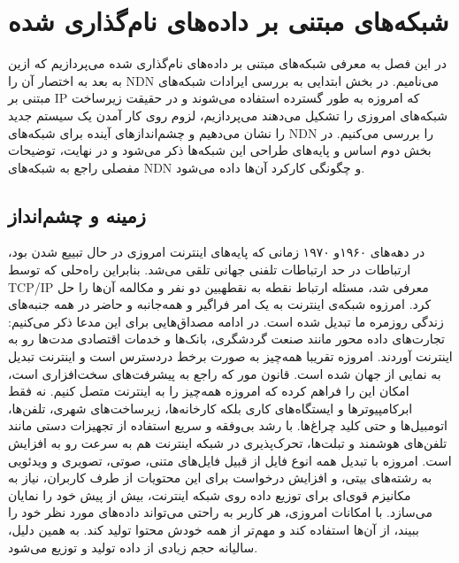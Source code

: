 

\chapter{ شبکه‌های مبتنی بر داده‌های نام‌گذاری شده}
در این فصل به معرفی شبکه‌های مبتنی بر داده‌های نام‌گذاری شده می‌پردازیم که ازین به بعد به اختصار آن را  NDN می‌نامیم.  در بخش ابتدایی به بررسی ایرادات شبکه‌های مبتنی بر IP که امروزه به طور گسترده استفاده می‌شوند و در حقیقت زیرساخت شبکه‌های امروزی را تشکیل می‌دهند می‌پردازیم، لزوم روی کار آمدن یک سیستم جدید را نشان می‌دهیم و چشم‌اندازهای آینده برای شبکه‌های NDN را بررسی می‌کنیم. در بخش دوم اساس و پایه‌های طراحی این شبکه‌ها ذکر می‌شود و در نهایت، توضیحات مفصلی راجع به شبکه‌های NDN و چگونگی کارکرد آن‌ها داده می‌شود. 

\section{زمینه و چشم‌انداز}

در دهه‌‌های ۱۹۶۰و ۱۹۷۰ زمانی که پایه‌‌های اینترنت امروزی در حال تبییع شدن بود، ارتباطات در حد ارتباطات تلفنی جهانی تلقی می‌شد. بنابراین راه‌حلی که توسط TCP/IP معرفی شد، مسئله ارتباط نقطه به نقطهبین دو نفر و مکالمه آن‌ها را حل کرد.  
امرزوه شبکه‌ی اینترنت به یک امر فراگیر و همه‌جانبه و حاضر در همه جنبه‌های زندگی روزمره ما تبدیل شده است. در ادامه مصداق‌‌هایی برای این مدعا ذکر می‌کنیم:‌
  تجارت‌های داده محور مانند صنعت گردشگری، بانک‌ها و خدمات اقتصادی مدت‌ها رو به اینترنت آوردند. امروزه تقریبا همه‌چیز به صورت برخط دردسترس است و اینترنت تبدیل به نمایی از جهان شده است. 
 قانون مور که راجع به پیشرفت‌های سخت‌افزاری است، امکان این را فراهم کرده که امروزه همه‌چیز را به اینترنت متصل کنیم. نه فقط ابرکامپیوترها و ایستگاه‌‌های کاری  بلکه کارخانه‌ها، زیرساخت‌های شهری، تلفن‌ها، اتومبیل‌ها و حتی کلید چراغ‌‌ها. با رشد بی‌وفقه و سریع استفاده از تجهیزات دستی مانند تلفن‌های هوشمند و  تبلت‌ها، تحرک‌پذیری در شبکه اینترنت هم به سرعت رو به افزایش است. 
 امروزه با تبدیل همه انوع فایل از قبیل فایل‌‌های متنی، صوتی، تصویری و ویدئویی به رشته‌های بیتی، و افزایش درخواست برای این محتویات از طرف کاربران، نیاز به مکانیزم قوی‌ای برای توزیع داده روی شبکه اینترنت، بیش از پیش خود را نمایان می‌سازد.
 با امکانات امروزی، هر کاربر به راحتی می‌تواند داده‌های مورد نظر خود را ببیند، از آن‌ها استفاده کند و مهم‌تر از همه خودش محتوا تولید کند. به همین دلیل، سالیانه حجم زیادی از داده تولید و توزیع می‌شود.    

